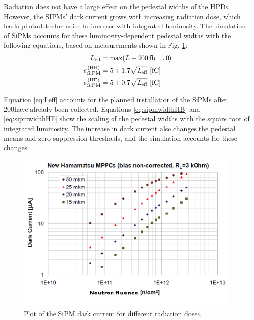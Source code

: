 Radiation does not have a large effect on the pedestal widths of the HPDs. However, the SIPMs' dark current grows with increasing radiation dose, which leads photodetector noise to increase with integrated luminosity. The simulation of SiPMs accounts for these luminosity-dependent pedestal widths with the following equations, based on measurements shown in Fig. \ref{fig:sipm_darkcurrent}:
\begin{align}
L_{\text{eff}} &= \text{max}(L - 200\mbox{\ensuremath{\,\text{fb}^\text{$-$1}}},0) \label{eq:Leff} \\
\sigma_{\text{SiPM}}^{\text{(HB)}} &= 5 + 1.7 \sqrt{L_{\text{eff}}}~\text{[fC]} \label{eq:sipmwidthHB}\\
\sigma_{\text{SiPM}}^{\text{(HE)}} &= 5 + 0.7 \sqrt{L_{\text{eff}}}~\text{[fC]} \label{eq:sipmwidthHE}
\end{align}

Equation \eqref{eq:Leff} accounts for the planned installation of the SiPMs after 200\fbinv have already been collected. Equations \eqref{eq:sipmwidthHB} and \eqref{eq:sipmwidthHE} show the scaling of the pedestal widths with the square root of integrated luminosity. The increase in dark current also changes the pedestal means and zero suppression thresholds, and the simulation accounts for these changes.

\begin{figure}[hbtp]
  \begin{center}
    \includegraphics[width=0.98\textwidth]{figures/leakagecurrentneutrons.png}
    \caption{Plot of the SiPM dark current for different radiation doses.~\cite{hcaluptdr}}
    \label{fig:sipm_darkcurrent}
  \end{center}
\end{figure}

